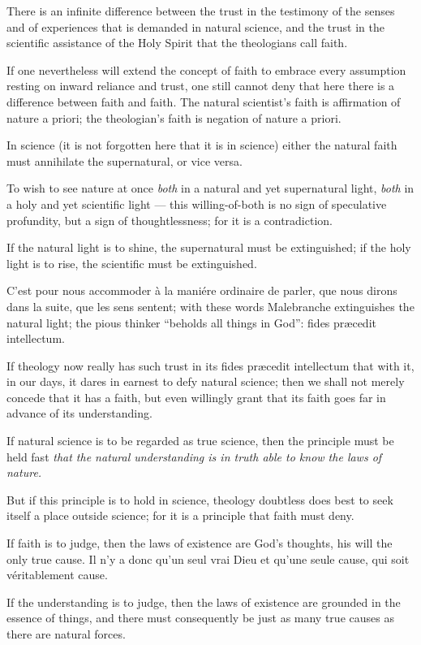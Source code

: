 \documentclass[12pt,a4paper]{article}
\begin{document}
There is an infinite difference between the trust in the testimony of the senses
and of experiences that is demanded in natural science, and the trust in the
scientific assistance of the Holy Spirit that the theologians call faith.

If one nevertheless will extend the concept of faith to embrace every assumption
resting on inward reliance and trust, one still cannot deny that here there is a
difference between faith and faith. The natural scientist's faith is affirmation of
nature a priori; the theologian's faith is negation of nature a priori.

In science (it is not forgotten here that it is in science) either the natural
faith must annihilate the supernatural, or vice versa.

To wish to see nature at once \emph{both} in a natural and yet supernatural light,
\emph{both} in a holy and yet scientific light --- this willing-of-both is no sign
of speculative profundity, but a sign of thoughtlessness; for it is a contradiction.

If the natural light is to shine, the supernatural must be extinguished; if the
holy light is to rise, the scientific must be extinguished.

C'est pour nous accommoder à la maniére ordinaire de parler, que nous dirons dans
la suite, que les sens sentent; with these words Malebranche extinguishes the
natural light; the pious thinker ``beholds all things in God'': fides præcedit
intellectum.

If theology now really has such trust in its fides præcedit intellectum that with
it, in our days, it dares in earnest to defy natural science; then we shall not
merely concede that it has a faith, but even willingly grant that its faith goes
far in advance of its understanding.

If natural science is to be regarded as true science, then the principle must be
held fast \emph{that the natural understanding is in truth able to know the laws of
nature.}

But if this principle is to hold in science, theology
doubtless does best to seek itself a place outside science; for it is a principle
that faith must deny.

If faith is to judge, then the laws of existence are God's thoughts, his will the
only true cause. Il n'y a donc qu'un seul vrai Dieu et qu'une seule cause, qui soit
véritablement cause.

If the understanding is to judge, then the laws of existence are grounded in the
essence of things, and there must consequently be just as many true causes as there
are natural forces.
\end{document}
